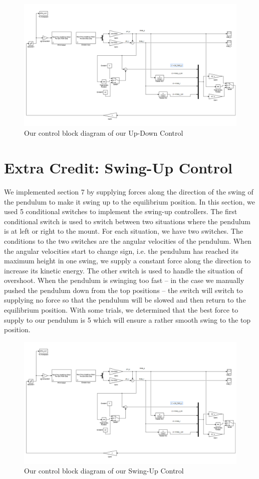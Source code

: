 \begin{figure}
  \caption{Our control block diagram of our Up-Down Control}
  \centering
    \includegraphics[scale = 0.4]{updown.PNG}
\end{figure}

\section{Extra Credit: Swing-Up Control}
We implemented section 7 by supplying forces along the direction of the swing of the pendulum to make it swing up to the equilibrium position.
In this section, we used 5 conditional switches to implement the swing-up controllers. The first conditional switch is used to switch between two situations where the pendulum is at left or right to the mount. For each situation, we have two switches. The conditions to the two switches are the angular velocities of the pendulum. When the angular velocities start to change sign, i.e. the pendulum has reached its maximum height in one swing, we supply a constant force along the direction to increase its kinetic energy. The other switch is used to handle the situation of overshoot. When the pendulum is swinging too fast – in the case we manually pushed the pendulum down from the top positions – the switch will switch to supplying no force so that the pendulum will be slowed and then return to the equilibrium position. With some trials, we determined that the best force to supply to our pendulum is 5 which will ensure a rather smooth swing to the top position.

\begin{figure}
  \caption{Our control block diagram of our Swing-Up Control}
  \centering
    \includegraphics[scale = 0.4]{updown.PNG}
\end{figure}